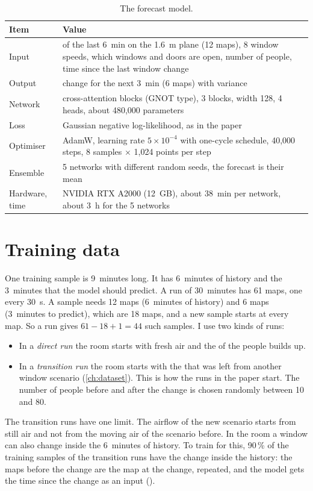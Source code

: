 \begin{table}[h]
  \centering
  \caption{The forecast model.}
  \label{tab:model}
  \begin{tabular}{>{\raggedright}p{4cm}p{9.7cm}}
    \toprule
    Item & Value\\
    \midrule
    Input & \cotwo{} of the last 6~min on the 1.6~m plane (12 maps), 8 window speeds, which windows and doors are open, number of people, time since the last window change\\
    Output & \cotwo{} change for the next 3~min (6 maps) with variance\\
    Network & cross-attention blocks (GNOT type), 3 blocks, width 128, 4 heads, about 480,000 parameters\\
    Loss & Gaussian negative log-likelihood, as in the paper\\
    Optimiser & AdamW, learning rate $5\times10^{-4}$ with one-cycle schedule, 40,000 steps,
               8 samples $\times$ 1,024 points per step\\
    Ensemble & 5 networks with different random seeds, the forecast is their mean\\
    Hardware, time & NVIDIA RTX A2000 (12~GB), about 38~min per network, about 3~h for the 5 networks\\
    \bottomrule
  \end{tabular}
\end{table}

\section{Training data}
One training sample is 9~minutes long. It has 6~minutes of history and the 3~minutes that the model should
predict. A run of 30~minutes has 61 \cotwo{} maps, one every 30~s. A sample needs 12 maps (6~minutes of history) and 6 maps
(3~minutes to predict), which are 18 maps, and a new sample starts at every map. So a run gives $61 - 18 + 1 = 44$ such
samples. I use two kinds of runs:
\begin{itemize}
  \item In a \emph{direct run} the room starts with fresh air and the \cotwo{} of the people builds up.
  \item In a \emph{transition run} the room starts with the \cotwo{} that was left from another window
        scenario (\cref{ch:dataset}). This is how the runs in the paper start. The number of people before and
        after the change is chosen randomly between 10 and 80.
\end{itemize}
The transition runs have one limit. The airflow of the new scenario starts from still air and not from the
moving air of the scenario before. In the room a window can also change inside the 6~minutes of history. To
train for this, 90\,\% of the training samples of the transition runs have the change inside the history: the
maps before the change are the map at the change, repeated, and the model gets the time since the change as an
input ().

